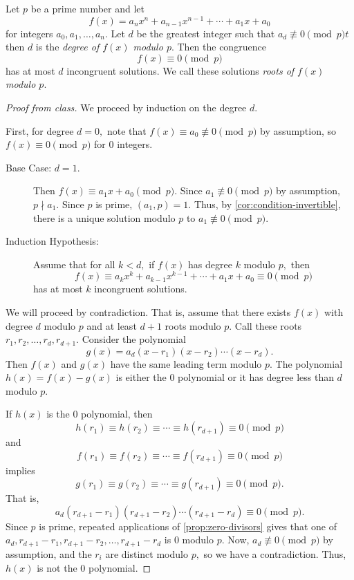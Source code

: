 \documentclass{ximera}
\begin{document}
\begin{theorem}[Lagrange]\label{thm:lagrange}
    Let $p$ be a prime number and let 
    \[f(x)=a_n x^n +a_{n-1} x^{n-1}+\cdots +a_1 x+a_0\]
    for integers $a_0,a_1,\dots,a_n.$ Let $d$ be the greatest integer such that $a_d\not\equiv 0\pmod{p}t$ then $d$ is the \emph{degree of $f(x)$ modulo $p.$}
    Then the congruence 
    \[f(x)\equiv 0\pmod{p}\]
    has at most $d$ incongruent solutions. We call these solutions \emph{roots of $f(x)$ modulo $p.$}
    

    \begin{proof}[Proof from class]
        We proceed by induction on the degree $d.$
        
        First, for degree $d=0,$ note that $f(x)\equiv a_0\not\equiv 0\pmod{p}$ by assumption, so $f(x)\equiv 0\pmod{p}$ for $0$ integers.

            
        \begin{description}
                
            \item[Base Case: $d=1$.] 
            Then $f(x)\equiv a_1 x+a_0\pmod{p}$. Since $a_1\not\equiv 0\pmod{p}$ by assumption, $p\nmid a_1.$ Since $p$ is prime, $(a_1,p)=1.$ Thus, by \cref{cor:condition-invertible}, there is a unique solution modulo $p$ to $a_1\not\equiv 0\pmod{p}.$

            \item[Induction Hypothesis:]
            Assume that for all $k\lt d,$ if $f(x)$ has degree $k$ modulo $p,$ then 
            \[f(x)\equiv a_k x^k +a_{k-1}x^{k-1}+\cdots+a_1x+a_0\equiv 0 \pmod{p}\]
            has at most $k$ incongruent solutions.
        \end{description}

        We will proceed by contradiction. That is, assume that there exists $f(x)$ with degree $d$ modulo $p$ and at least $d+1$ roots modulo $p.$ Call these roots $r_1,r_2,\dots,r_d,r_{d+1}.$ Consider the polynomial \[g(x)=a_d(x-r_1)(x-r_2)\cdots (x-r_d).\]
        Then $f(x)$ and $g(x)$ have the same leading term modulo $p.$ The polynomial $h(x)=f(x)-g(x)$ is either the $0$ polynomial or it has degree less than $d$ modulo $p.$

        If $h(x)$ is the $0$ polynomial, then 
        \[h(r_{1})\equiv h(r_2)\equiv\cdots\equiv h(r_{d+1})\equiv 0\pmod{p}\]
        and 
        \[f(r_{1})\equiv f(r_2)\equiv\cdots\equiv f(r_{d+1})\equiv 0\pmod{p}\]
        implies
        \[g(r_{1})\equiv g(r_2)\equiv\cdots\equiv g(r_{d+1})\equiv 0\pmod{p}.\]
        That is, 
        \[a_d(r_{d+1}-r_1)(r_{d+1}-r_2)\cdots(r_{d+1}-r_d)\equiv 0\pmod{p}.\]
        Since $p$ is prime, repeated applications of \cref{prop:zero-divisors} gives that one of $a_d,r_{d+1}-r_1,r_{d+1}-r_2,\dots,r_{d+1}-r_d$ is $0$ modulo $p.$ Now, $a_d\not\equiv0\pmod{p}$ by assumption, and the $r_i$ are distinct modulo $p,$ so we have a contradiction. Thus, $h(x)$ is not the $0$ polynomial. 


\end{proof}
\end{theorem}
\end{document}
